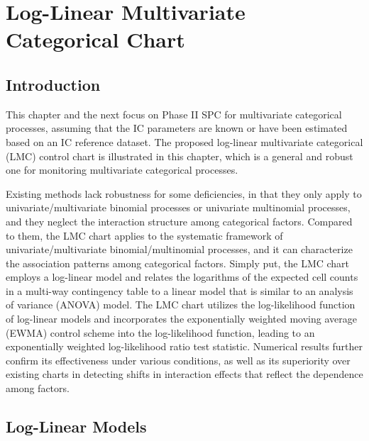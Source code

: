 \chapter{Log-Linear Multivariate Categorical Chart}\label{chp2}

\section{Introduction}\label{sec2.1}

This chapter and the next focus on Phase II SPC for multivariate categorical
processes, assuming that the IC parameters are known or have been estimated based on
an IC reference dataset. The proposed log-linear multivariate categorical (LMC)
control chart is illustrated in this chapter, which is a general and robust one for
monitoring multivariate categorical processes.

Existing methods lack robustness for some deficiencies, in that they only apply to
univariate/multivariate binomial processes or univariate multinomial processes, and
they neglect the interaction structure among categorical factors. Compared to them,
the LMC chart applies to the systematic framework of univariate/multivariate
binomial/multinomial processes, and it can characterize the association patterns
among categorical factors. Simply put, the LMC chart employs a log-linear model and
relates the logarithms of the expected cell counts in a multi-way contingency table
to a linear model that is similar to an analysis of variance (ANOVA) model. The LMC
chart utilizes the log-likelihood function of log-linear models and incorporates the
exponentially weighted moving average (EWMA) control scheme into the log-likelihood
function, leading to an exponentially weighted log-likelihood ratio test statistic.
Numerical results further confirm its effectiveness under various conditions, as
well as its superiority over existing charts in detecting shifts in interaction
effects that reflect the dependence among factors.



\section{Log-Linear Models}\label{sec2.2}

